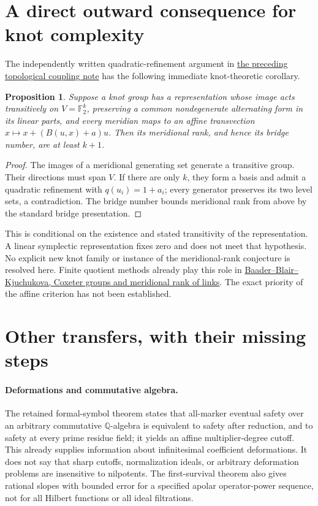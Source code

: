 \documentclass[11pt]{article}
\newtheorem{proposition}{Proposition}
\begin{document}
\section{A direct outward consequence for knot complexity}

The independently written quadratic-refinement argument in
\href{BREAKTHROUGH_SEARCH_TOPOLOGICAL_COUPLING_2026_11_16.tex}{the preceding topological coupling note}
has the following immediate knot-theoretic corollary.

\begin{proposition}
Suppose a knot group has a representation whose image acts transitively on
$V=\mathbb F_2^k$, preserving a common nondegenerate alternating form in
its linear parts, and every meridian maps to an affine transvection
$x\mapsto x+(B(u,x)+a)u$. Then its meridional rank, and hence its bridge
number, are at least $k+1$.
\end{proposition}
\begin{proof}
The images of a meridional generating set generate a transitive group.
Their directions must span $V$. If there are only $k$, they form a basis
and admit a quadratic refinement with $q(u_i)=1+a_i$; every generator
preserves its two level sets, a contradiction. The bridge number bounds
meridional rank from above by the standard bridge presentation.
\end{proof}

This is conditional on the existence and stated transitivity of the
representation. A linear symplectic representation fixes zero and does
not meet that hypothesis. No explicit new knot family or instance of the
meridional-rank conjecture is resolved here. Finite quotient methods
already play this role in
\href{https://doi.org/10.1007/s00208-020-02124-z}{Baader--Blair--Kjuchukova,
Coxeter groups and meridional rank of links}. The exact priority of the
affine criterion has not been established.

\section{Other transfers, with their missing steps}

\paragraph{Deformations and commutative algebra.}
The retained formal-symbol theorem states that all-marker eventual safety
over an arbitrary commutative $\mathbb Q$-algebra is equivalent to safety
after reduction, and to safety at every prime residue field; it yields an
affine multiplier-degree cutoff. This already supplies information about
infinitesimal coefficient deformations. It does not say that sharp
cutoffs, normalization ideals, or arbitrary deformation problems are
insensitive to nilpotents. The first-survival theorem also gives rational
slopes with bounded error for a specified apolar operator-power sequence,
not for all Hilbert functions or all ideal filtrations.
\end{document}
